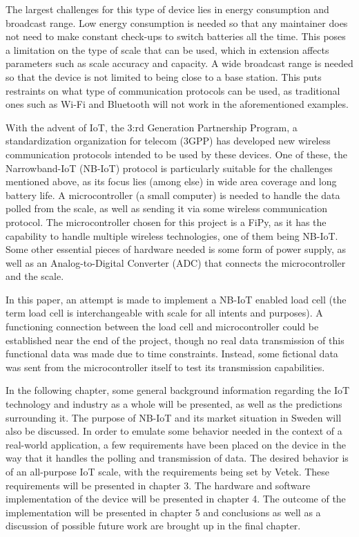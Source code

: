 The largest challenges for this type of device lies in energy consumption and broadcast range. Low energy consumption is needed so that any maintainer does not need to make constant check-ups to switch batteries all the time. This poses a limitation on the type of scale that can be used, which in extension affects parameters such as scale accuracy and capacity. A wide broadcast range is needed so that the device is not limited to being close to a base station. This puts restraints on what type of communication protocols can be used, as traditional ones such as Wi-Fi and Bluetooth will not work in the aforementioned examples.

With the advent of IoT, the 3:rd Generation Partnership Program, a standardization organization for telecom (3GPP) has developed new wireless communication protocols intended to be used by these devices.\cite{3gpp} One of these, the Narrowband-IoT (NB-IoT) protocol is particularly suitable for the challenges mentioned above, as its focus lies (among else) in wide area coverage and long battery life. A microcontroller (a small computer) is needed to handle the data polled from the scale, as well as sending it via some wireless communication protocol. The microcontroller chosen for this project is a FiPy, as it has the capability to handle multiple wireless technologies, one of them being NB-IoT. Some other essential pieces of hardware needed is some form of power supply, as well as an Analog-to-Digital Converter (ADC) that connects the microcontroller and the scale.

In this paper, an attempt is made to implement a NB-IoT enabled load cell (the term load cell is interchangeable with scale for all intents and purposes). A functioning connection between the load cell and microcontroller could be established near the end of the project, though no real data transmission of this functional data was made due to time constraints. Instead, some fictional data was sent from the microcontroller itself to test its transmission capabilities.

In the following chapter, some general background information regarding the IoT technology and industry as a whole will be presented, as well as the predictions surrounding it. The purpose of NB-IoT and its market situation in Sweden will also be discussed. 
In order to emulate some behavior needed in the context of a real-world application, a few requirements have been placed on the device in the way that it handles the polling and transmission of data. The desired behavior is of an all-purpose IoT scale, with the requirements being set by Vetek.  These requirements will be presented in chapter 3.
The hardware and software implementation of the device will be presented in chapter 4.
The outcome of the implementation will be presented in chapter 5 and
conclusions as well as a discussion of possible future work are brought up in the final chapter.

